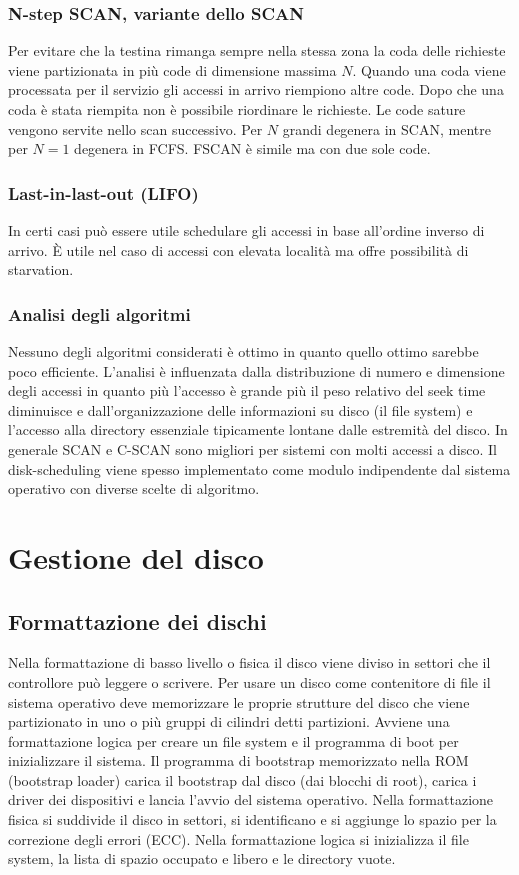\subsubsection{N-step SCAN, variante dello SCAN}
Per evitare che la testina rimanga sempre nella stessa zona la coda delle richieste viene partizionata in pi\`u code di dimensione massima $N$. Quando una coda viene processata per
il servizio gli accessi in arrivo riempiono altre code. Dopo che una coda \`e stata riempita non \`e possibile riordinare le richieste. Le code sature vengono servite nello scan 
successivo. Per $N$ grandi degenera in SCAN, mentre per $N = 1$ degenera in FCFS. FSCAN \`e simile ma con due sole code. 
\subsubsection{Last-in-last-out (LIFO)}
In certi casi pu\`o essere utile schedulare gli accessi in base all'ordine inverso di arrivo. \`E utile nel caso di accessi con elevata localit\`a ma offre possibilit\`a di 
starvation. 
\subsubsection{Analisi degli algoritmi}
Nessuno degli algoritmi considerati \`e ottimo in quanto quello ottimo sarebbe poco efficiente. L'analisi \`e influenzata dalla distribuzione di numero e dimensione degli accessi in
quanto pi\`u l'accesso \`e grande pi\`u il peso relativo del seek time diminuisce e dall'organizzazione delle informazioni su disco (il file system) e l'accesso alla directory 
essenziale tipicamente lontane dalle estremit\`a del disco. In generale SCAN e C-SCAN sono migliori per sistemi con molti accessi a disco. Il disk-scheduling viene spesso implementato
come modulo indipendente dal sistema operativo con diverse scelte di algoritmo. 
\section{Gestione del disco}
\subsection{Formattazione dei dischi}
Nella formattazione di basso livello o fisica il disco viene diviso in settori che il controllore pu\`o leggere o scrivere. Per usare un disco come contenitore di file il sistema 
operativo deve memorizzare le proprie strutture del disco che viene partizionato in uno o pi\`u gruppi di cilindri detti partizioni. Avviene una formattazione logica per creare un 
file system e il programma di boot per inizializzare il sistema. Il programma di bootstrap memorizzato nella ROM (bootstrap loader) carica il bootstrap dal disco (dai blocchi di root), 
carica i driver dei dispositivi e lancia l'avvio del sistema operativo. Nella formattazione fisica si suddivide il disco in settori, si identificano e si aggiunge lo spazio per la 
correzione degli errori (ECC). Nella formattazione logica si inizializza il file system, la lista di spazio occupato e libero e le directory vuote.
